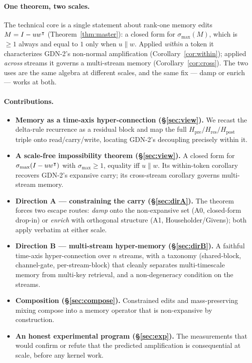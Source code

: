 \documentclass[11pt,letterpaper,logo]{yalearxiv}
\newcommand{\smax}{\sigma_{\max}}
\newcommand{\Hres}{H_{\mathrm{res}}}
\newcommand{\Hpre}{H_{\mathrm{pre}}}
\newcommand{\Hpost}{H_{\mathrm{post}}}
\begin{document}
\paragraph{One theorem, two scales.} The technical core is a single statement about
rank-one memory edits $M = I - u w^{\intercal}$ (Theorem~\ref{thm:master}): a closed form for
$\smax(M)$, which is $\ge 1$ always and equal to $1$ only when $u \parallel w$. Applied
\emph{within} a token it characterizes GDN-2's non-normal amplification
(Corollary~\ref{cor:within}); applied \emph{across} streams it governs a multi-stream
memory (Corollary~\ref{cor:cross}). The two uses are the same algebra at different scales,
and the same fix --- damp or enrich --- works at both.

\paragraph{Contributions.}
\begin{itemize}[leftmargin=1.5em,itemsep=1pt,topsep=2pt]
  \item \textbf{Memory as a time-axis hyper-connection (\S\ref{sec:view}).} We recast the
  delta-rule recurrence as a residual block and map the full $\Hpre/\Hres/\Hpost$ triple
  onto read/carry/write, locating GDN-2's decoupling precisely within it.
  \item \textbf{A scale-free impossibility theorem (\S\ref{sec:view}).} A closed form for
  $\smax(I - u w^{\tr})$ with $\smax \ge 1$, equality iff $u \parallel w$. Its
  within-token corollary recovers GDN-2's expansive carry; its cross-stream corollary
  governs multi-stream memory.
  \item \textbf{Direction A --- constraining the carry (\S\ref{sec:dirA}).} The theorem
  forces two escape routes: \emph{damp} onto the non-expansive set (A0, closed-form
  drop-in) or \emph{enrich} with orthogonal structure (A1, Householder/Givens); both apply
  verbatim at either scale.
  \item \textbf{Direction B --- multi-stream hyper-memory (\S\ref{sec:dirB}).} A faithful
  time-axis hyper-connection over $n$ streams, with a taxonomy (shared-block, channel-gate,
  per-stream-block) that cleanly separates multi-timescale memory from multi-key retrieval,
  and a non-degeneracy condition on the streams.
  \item \textbf{Composition (\S\ref{sec:compose}).} Constrained edits and mass-preserving
  mixing compose into a memory operator that is non-expansive by construction.
  \item \textbf{An honest experimental program (\S\ref{sec:exp}).} The measurements that
  would confirm or refute that the predicted amplification is consequential at scale,
  before any kernel work.
\end{itemize}
\end{document}
